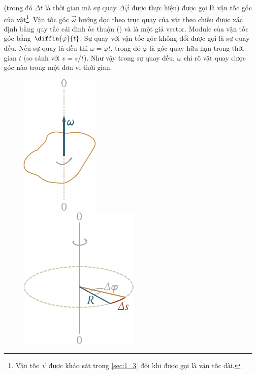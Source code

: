 \noindent
(trong đó $\Delta t$ là thời gian mà sự quay $\Delta\vec{\varphi}$ được thực hiện) được gọi là vận tốc góc của vật\footnote{Vận tốc $\vec{v}$  được khảo sát trong \ref{sec:1_3} đôi khi được gọi là vận tốc dài.}. Vận tốc góc $\vec{\omega}$ hướng dọc theo trục quay của vật theo chiều được xác định bằng quy tắc cái đinh ốc thuận () và là một giả vector. Module của vận tốc góc bằng $\diffin{\varphi}{t}$. Sự quay với vận tốc góc không đổi được gọi là sự quay đều. Nếu sự quay là đều thì $\omega=\varphi t$, trong đó $\varphi$ là góc quay hữu hạn trong thời gian $t$ (so sánh với $v=s/t$). Như vậy trong sự quay đều, $\omega$ chỉ rõ vật quay được góc nào trong một đơn vị thời gian.

\begin{figure}[!htb]
	\begin{minipage}[t]{0.5\linewidth}
		\begin{center}
			\includegraphics[scale=1]{figures/ch_01/fig_1_31.pdf}
			\caption[]{}
			\label{fig:1_31}
		\end{center}
	\end{minipage}
	\hspace{-0.1cm}
	\begin{minipage}[t]{0.5\linewidth}
		\begin{center}
			\includegraphics[scale=0.95]{figures/ch_01/fig_1_32.pdf}
			\caption[]{}
			\label{fig:1_32}
		\end{center}
	\end{minipage}
	\vspace{-0.5cm}
\end{figure}

